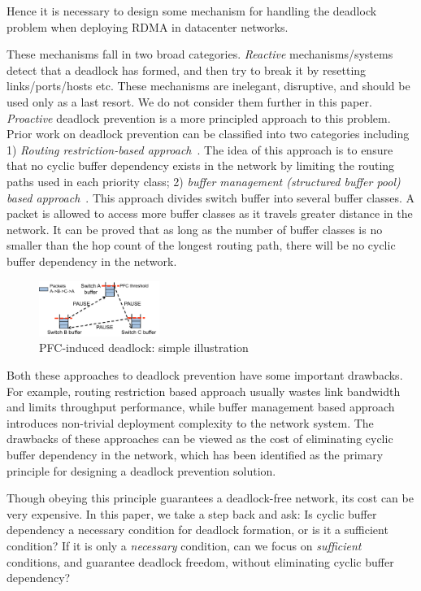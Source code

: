 Hence it is necessary to design some mechanism for handling the deadlock
problem when deploying RDMA in datacenter networks. 

These mechanisms fall in two broad categories. {\em Reactive} mechanisms/systems
detect that a deadlock has formed, and then try to break it by resetting
links/ports/hosts etc.  These mechanisms are inelegant, disruptive, and should
be used only as a last resort.  We do not consider them further in this paper.
{\em Proactive} deadlock prevention is a more principled approach to this
problem.  Prior work on deadlock prevention can be classified into two
categories including 1) \textit{Routing restriction-based
approach}~\cite{tcpbolt,flich2012survey}. The idea of this approach is to ensure
that no cyclic buffer dependency exists in the network by limiting the routing
paths used in each priority class;  2) \textit{buffer management (structured
buffer pool) based approach}~\cite{gerla1980flow,karol2003prevention}. This
approach divides switch buffer into several buffer classes. A packet is allowed
to access more buffer classes as it travels greater distance in the network. It
can be proved that as long as the number of buffer classes is no smaller than
the hop count of the longest routing path, there will be no cyclic buffer
dependency in the network.

\begin{figure}
\centering
\includegraphics[width=0.35\textwidth] {figs/deadlock}
\vspace{-0.15in}
\caption{PFC-induced deadlock: simple illustration}
\vspace{-0.25in}
\label{fig:deadlock_example}
\end{figure}

Both these approaches to deadlock prevention have some important drawbacks. For
example, routing restriction based approach usually wastes link bandwidth and
limits throughput performance, while buffer management based approach introduces
non-trivial deployment complexity to the network system. The drawbacks of these
approaches can be viewed as the cost of eliminating cyclic buffer dependency in
the network, which has been identified as the primary principle for designing a
deadlock prevention solution.

Though obeying this principle guarantees a deadlock-free network, its cost can
be very expensive. In this paper, we take a step back and ask: Is cyclic buffer
dependency a necessary condition for deadlock formation, or is it a sufficient
condition? If it is only a {\em necessary} condition, can we focus on {\em
sufficient} conditions, and guarantee deadlock freedom, without  eliminating
cyclic buffer dependency?

